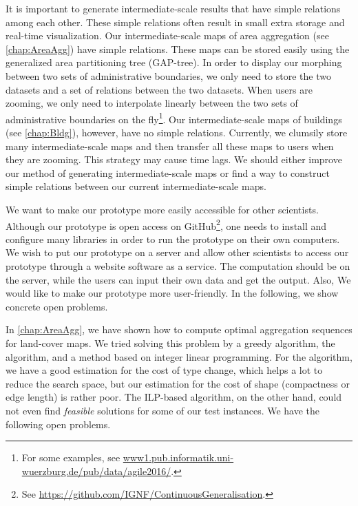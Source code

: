 It is important to generate intermediate-scale results 
that have simple relations among each other.
These simple relations often result in 
small extra storage and real-time visualization.
Our intermediate-scale maps of area aggregation 
(see \chap\ref{chap:AreaAgg}) 
have simple relations.
These maps can be stored easily
using the generalized area partitioning tree (GAP-tree).
In order to display our morphing between 
two sets of administrative boundaries, 
we only need to store the two datasets 
and a set of relations between the two datasets. 
When users are zooming,
we only need to interpolate linearly between 
the two sets of administrative boundaries 
on the fly\footnote{For some examples, see 
\url{www1.pub.informatik.uni-wuerzburg.de/pub/data/agile2016/}.}.
Our intermediate-scale maps of buildings 
(see \chap\ref{chap:Bldg}), 
however, have no simple relations.
Currently, we clumsily store many intermediate-scale maps
and then transfer all these maps to users when they are zooming.
This strategy may cause time lags.
We should either improve our method of generating 
intermediate-scale maps 
or find a way to construct simple relations 
between our current intermediate-scale maps.

We want to make our prototype more easily accessible 
for other scientists.
Although our prototype is open access on GitHub\footnote{See 
\url{https://github.com/IGNF/ContinuousGeneralisation}.},
one needs to install and configure many libraries in order to 
run the prototype on their own computers.
We wish to put our prototype on a server and allow 
other scientists to access our prototype through a website
software as a service.
The computation should be on the server,
while the users can input their own data and get the output.
Also, We would like to make our prototype more user-friendly.
In the following, we show concrete open problems.

In \chap\ref{chap:AreaAgg}, 
we have shown how to compute optimal
aggregation sequences for %
land-cover maps.
We tried solving this problem by a greedy algorithm,
the \Astar algorithm,
and a method based on integer linear programming.
For the \Astar algorithm, 
we have a good estimation for the cost of type change, 
which helps a lot to reduce the search space, 
but our estimation for the cost of shape 
(compactness or edge length) is rather poor.
The ILP-based algorithm, on the other hand, 
could not even find \emph{feasible} solutions 
for some of our test instances.
We have the following open problems.
 
